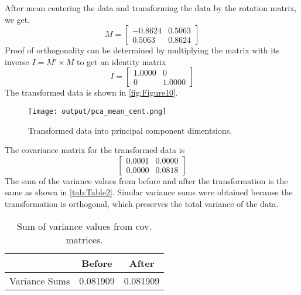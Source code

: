 \documentclass[12pt]{report}
\begin{document}
\begin{enumerate}
    After mean centering the data and transforming the data by the rotation matrix, we get,
    $$
    M = 
    \begin{bmatrix}
    -0.8624 &  0.5063 \\
    0.5063  &  0.8624
    \end{bmatrix}
    $$
    Proof of orthogonality can be determined by multiplying the matrix with its inverse $I = M' \times M$ to get an 
    identity matrix
    $$
    I = 
    \begin{bmatrix}
    1.0000  &      0 \\
    0       & 1.0000
    \end{bmatrix}
    $$
    The transformed data is shown in \autoref{fig:Figure10}. 
    
    \begin{figure}[ht!]
        \texttt{[image: output/pca\_mean\_cent.png]}
        \centering
        \caption{Transformed data into principal component dimentsions.}
        \label{fig:Figure10}
    \end{figure}

    The covariance matrix for the transformed data is 
    $$
    \begin{bmatrix}
    0.0001  &  0.0000 \\
    0.0000  &  0.0818
    \end{bmatrix}
    $$
    The sum of the variance values from before and after the transformation is the same as shown 
    in \autoref{tab:Table2}. Similar variance sums were obtained because the transformation is 
    orthogonal, which preserves the total variance of the data.

    \begin{table}[h!]
    \begin{center}
    \begin{tabular}{ c | c | c } 
        \hline
         & Before & After \\ 
        \hline \hline
        Variance Sums & 0.081909 & 0.081909 \\ 
        \hline
    \end{tabular}
    \caption{Sum of variance values from cov. matrices.}
    \label{tab:Table2}
    \end{center}
    \end{table}

\end{enumerate}
\end{document}
